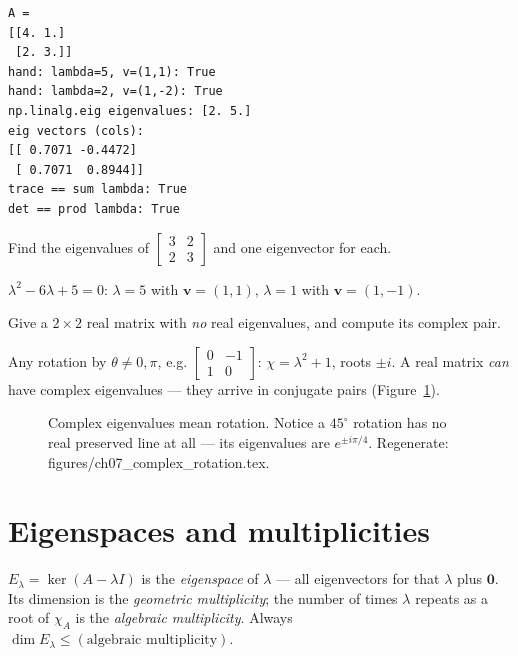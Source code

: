 \begin{lstlisting}[caption={Output of the eigen check. Notice the library's
vectors are the same \emph{lines} normalized --- $(1,1)/\sqrt2$ and
$(1,-2)/\sqrt5$ up to sign --- and both checksums pass.}]
A =
[[4. 1.]
 [2. 3.]]
hand: lambda=5, v=(1,1): True
hand: lambda=2, v=(1,-2): True
np.linalg.eig eigenvalues: [2. 5.]
eig vectors (cols):
[[ 0.7071 -0.4472]
 [ 0.7071  0.8944]]
trace == sum lambda: True
det == prod lambda: True
\end{lstlisting}

\begin{exercise}[easy]
Find the eigenvalues of $\begin{bmatrix}3&2\\2&3\end{bmatrix}$ and one
eigenvector for each.
\begin{solution}
$\lambda^2-6\lambda+5=0$: $\lambda=5$ with $\mathbf v=(1,1)$, $\lambda=1$
with $\mathbf v=(1,-1)$.
\end{solution}
\end{exercise}

\begin{exercise}[medium]
Give a $2\times2$ real matrix with \emph{no} real eigenvalues, and compute
its complex pair.
\begin{solution}
Any rotation by $\theta\ne0,\pi$, e.g.
$\begin{bmatrix}0&-1\\1&0\end{bmatrix}$: $\chi=\lambda^2+1$, roots
$\pm i$. A real matrix \emph{can} have complex eigenvalues --- they arrive
in conjugate pairs (Figure~\ref{fig:complex-rot}).
\end{solution}
\end{exercise}

\begin{figure}[htbp]
\centering

\caption{Complex eigenvalues mean rotation. Notice a $45^\circ$ rotation
has no real preserved line at all --- its eigenvalues are
$e^{\pm i\pi/4}$. Regenerate: \ttfamily figures/ch07\_complex\_rotation.tex.}
\label{fig:complex-rot}
\end{figure}

\section{Eigenspaces and multiplicities}\label{sec:eig-mult}

\begin{definition}[Eigenspace]
$E_\lambda=\ker(A-\lambda I)$ is the \emph{eigenspace} of $\lambda$ --- all
eigenvectors for that $\lambda$ plus $\mathbf0$. Its dimension is the
\emph{geometric multiplicity}; the number of
times $\lambda$ repeats as a root of $\chi_A$ is the \emph{algebraic
multiplicity}. Always
$\dim E_\lambda\le(\text{algebraic multiplicity})$.
\end{definition}

